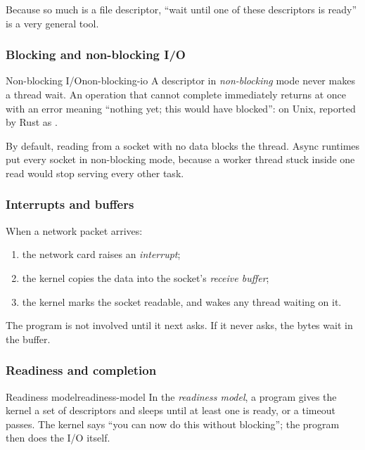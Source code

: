 Because so much is a file descriptor, ``wait until one of these descriptors is ready'' is a very general tool.

\subsubsection{Blocking and non-blocking I/O}

\begin{definition}{Non-blocking I/O}{non-blocking-io}
    A descriptor in \emph{non-blocking} mode never makes a thread wait. An operation that cannot complete immediately returns at once with an error meaning ``nothing yet; this would have blocked'':  on Unix, reported by Rust as .
\end{definition}

By default, reading from a socket with no data blocks the thread. Async runtimes put every socket in non-blocking mode, because a worker thread stuck inside one read would stop serving every other task.

\subsubsection{Interrupts and buffers}

When a network packet arrives:

\begin{enumerate}
    \item the network card raises an \emph{interrupt};
    \item the kernel copies the data into the socket's \emph{receive buffer};
    \item the kernel marks the socket readable, and wakes any thread waiting on it.
\end{enumerate}

The program is not involved until it next asks. If it never asks, the bytes wait in the buffer.

\subsubsection{Readiness and completion}

\begin{definition}{Readiness model}{readiness-model}
    In the \emph{readiness model}, a program gives the kernel a set of descriptors and sleeps until at least one is ready, or a timeout passes. The kernel says ``you can now do this without blocking''; the program then does the I/O itself.
\end{definition}

